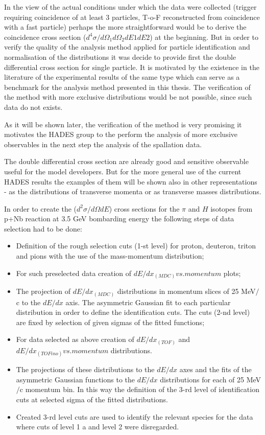 In the view of the actual conditions under which the data were collected (trigger requiring coincidence of at least 3 particles, T-o-F reconstructed from coincidence with a fast particle) perhaps the more straightforward 
would be to derive the coincidence cross section ($d^4\sigma/d\Omega_1 d\Omega_2 dE1 dE2$) at the beginning. But in order to verify the quality of the analysis method applied for particle identification and normalisation 
of the distributions it was decide to provide first the double differential cross section for single particle. It is motivated by the existence in the literature of the experimental results of the same type which can serve as a benchmark for the analysis method presented in this thesis. The verification of the method 
with more exclusive distributions would be not possible, since such data do not exists.

As it will be shown later, the verification of the method is very promising it motivates the HADES group to the perform the analysis of more exclusive observables in the next step the analysis of the spallation data.

The double differential cross section are already good and sensitive observable useful for the model developers. But for the more general use of  the current HADES results the examples of them will be shown also in other representations - as the distributions of transverse momenta or as transverse masses distributions. 

In order to create the ($d^2\sigma/d\Omega dE$) 
cross sections for the $\pi$ and $H$ isotopes from p+Nb reaction at 3.5 GeV bombarding energy 
the following steps of data selection had to be done:
\begin{itemize}
\item Definition of the rough selection cuts (1-st level) for proton, deuteron, triton and pions with the use of the 
mass-momentum distribution;
\item For such preselected data creation of $dE/dx_{(MDC)}  vs. momentum$ plots;
\item The projection of $dE/dx_{(MDC)}$ distributions in momentum slices of
25 MeV$/$c to the $dE/dx$ axis. The asymmetric Gaussian fit to each particular distribution in order to define the identification cuts. 
The cuts (2-nd level) are fixed by selection of given 
sigmas of the fitted functions;
\item For data selected as above creation of $dE/dx_{(TOF)}$ and 
$dE/dx_{(TOFino)} vs. momentum$ distributions.
\item The projections of these distributions to the $dE/dx$ axes and the 
fits of the asymmetric Gaussian functions  
to the $dE/dx$ distributions for each of 25 MeV$/$c momentum bin. 
In this way the definition of the 3-rd level of identification cuts at selected sigma of the fitted distributions.
\item Created 3-rd level cuts are used to identify the relevant species for the data where cuts of level 1 a and level 2 were disregarded.
\end{itemize}


